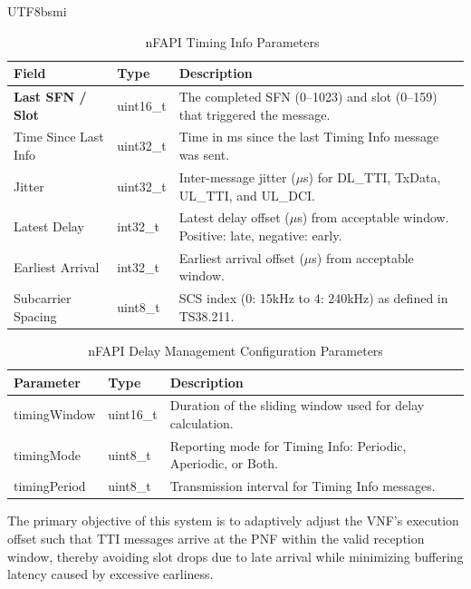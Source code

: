 \documentclass[conference]{IEEEtran}
\begin{document}
\begin{CJK}{UTF8}{bsmi}
\begin{table}[htbp]
\caption{nFAPI Timing Info Parameters~\cite{nfapi_spec}}
\label{tab:timing_info}
\begin{center}
\begin{tabularx}{\columnwidth}{l|l|X}
\toprule
\textbf{Field} & \textbf{Type} & \textbf{Description} \\ \midrule
\textbf{Last SFN / Slot} & uint16\_t & The completed SFN (0--1023) and slot (0--159) that triggered the message. \\ 
Time Since Last Info & uint32\_t & Time in ms since the last Timing Info message was sent. \\ 
Jitter & uint32\_t & Inter-message jitter ($\mu$s) for DL\_TTI, TxData, UL\_TTI, and UL\_DCI. \\ 
Latest Delay & int32\_t & Latest delay offset ($\mu$s) from acceptable window. Positive: late, negative: early. \\ 
Earliest Arrival & int32\_t & Earliest arrival offset ($\mu$s) from acceptable window. \\ 
Subcarrier Spacing & uint8\_t & SCS index (0: 15kHz to 4: 240kHz) as defined in TS38.211. \\ \bottomrule
\end{tabularx}
\end{center}
\end{table}

\begin{table}[htbp]
\caption{nFAPI Delay Management Configuration Parameters}
\label{tab:delay_mgmt_config}
\begin{center}
\begin{tabularx}{\columnwidth}{l|p{1.5cm}|X}
\toprule
\textbf{Parameter} & \textbf{Type} & \textbf{Description} \\ \midrule
timingWindow & uint16\_t & Duration of the sliding window used for delay calculation. \\
timingMode & uint8\_t & Reporting mode for Timing Info: Periodic, Aperiodic, or Both. \\
timingPeriod & uint8\_t & Transmission interval for Timing Info messages. \\ \bottomrule
\end{tabularx}
\end{center}
\end{table}

{\color{blue}
The primary objective of this system is to adaptively adjust the VNF's execution offset such that TTI messages arrive at the PNF within the valid reception window, thereby avoiding slot drops due to late arrival while minimizing buffering latency caused by excessive earliness.

}
\end{CJK}
\end{document}
